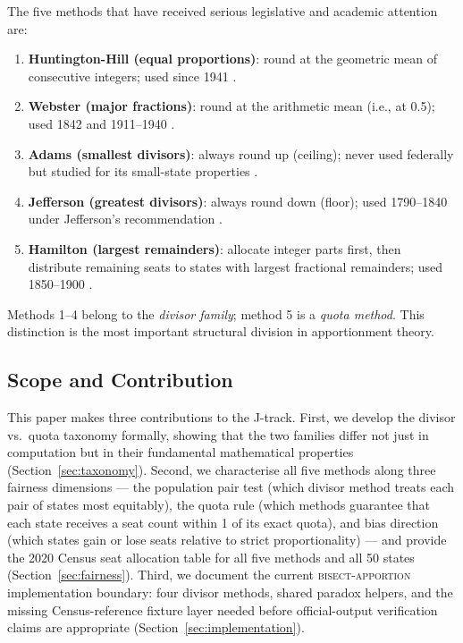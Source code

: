The five methods that have received serious legislative and academic
attention are:
\begin{enumerate}
  \item \textbf{Huntington-Hill (equal proportions)}: round at the geometric
    mean of consecutive integers; used since 1941 \citep{huntington1928method}.
  \item \textbf{Webster (major fractions)}: round at the arithmetic mean
    (i.e., at 0.5); used 1842 and 1911--1940 \citep{balinski1982fair}.
  \item \textbf{Adams (smallest divisors)}: always round up (ceiling);
    never used federally but studied for its small-state properties
    \citep{balinski1982fair}.
  \item \textbf{Jefferson (greatest divisors)}: always round down (floor);
    used 1790--1840 under Jefferson's recommendation \citep{schmeckebier1941congressional}.
  \item \textbf{Hamilton (largest remainders)}: allocate integer parts first,
    then distribute remaining seats to states with largest fractional remainders;
    used 1850--1900 \citep{balinski1982fair}.
\end{enumerate}
Methods 1--4 belong to the \emph{divisor family}; method 5 is a \emph{quota method}.
This distinction is the most important structural division in apportionment theory.

\subsection{Scope and Contribution}

This paper makes three contributions to the J-track.
First, we develop the divisor vs.\ quota taxonomy formally, showing that
the two families differ not just in computation but in their fundamental
mathematical properties (Section~\ref{sec:taxonomy}).
Second, we characterise all five methods along three fairness dimensions ---
the population pair test (which divisor method treats each pair of states
most equitably), the quota rule (which methods guarantee that each state
receives a seat count within 1 of its exact quota), and bias direction
(which states gain or lose seats relative to strict proportionality)
--- and provide the 2020 Census seat allocation table for all five methods
and all 50 states (Section~\ref{sec:fairness}).
Third, we document the current \textsc{bisect-apportion} implementation
boundary: four divisor methods, shared paradox helpers, and the missing
Census-reference fixture layer needed before official-output verification
claims are appropriate (Section~\ref{sec:implementation}).

